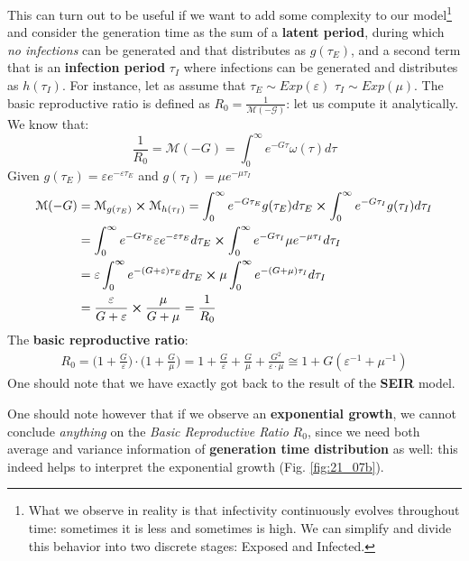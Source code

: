 \documentclass[../main/main.tex]{subfiles}
\begin{document}
This can turn out to be useful if we want to add some complexity to our model\footnote{What we observe in reality is that infectivity continuously evolves throughout time: sometimes it is less and sometimes is high. We can simplify and divide this behavior into two discrete stages: Exposed and Infected.} and consider the generation time as the sum of a \textbf{latent period}, during which \textit{no infections} can be generated and that distributes as $g(\tau_E)$, and a second term that is an \textbf{infection period} $\tau_I$ where infections can be generated and distributes as $h(\tau_I)$. For instance, let as assume that $\tau_E \sim Exp(\varepsilon)$ $\tau_I \sim Exp(\mu)$. The basic reproductive ratio is defined as $R_0 = \frac{1}{\mathcal{M(-G)}}$:
let us compute it analytically. We know that:
\begin{equation}
    \frac{1}{R_0} = \mathcal{M}(-G) = \int_{0}^{\infty} e^{-G \tau} \omega (\tau) d\tau
\end{equation}
Given $ g(\tau_E) = \varepsilon e^{-\varepsilon \tau_E} $ and $ g(\tau_I) = \mu e^{-\mu \tau_I} $
\begin{align*}
 \mathcal{M}(-G) & = \mathcal{M}_{g(\tau_E)} \cross \mathcal{M}_{h(\tau_I)} = \int_{0}^{\infty} e^{-G \tau_E} g(\tau_E) d\tau_E  \cross \int_{0}^{\infty} e^{-G \tau_I} g(\tau_I) d\tau_I\\
&= \int_{0}^{\infty} e^{-G \tau_E} \varepsilon e^{-\varepsilon \tau_E} d\tau_E \cross \int_{0}^{\infty} e^{-G \tau_I} \mu e^{-\mu \tau_I} d\tau_I\\
&= \varepsilon\int_{0}^{\infty} e^{-(G+\varepsilon) \tau_E} d\tau_E \cross \mu \int_{0}^{\infty} e^{-(G+\mu) \tau_I} d\tau_I\\
&= \frac{\varepsilon}{G+\varepsilon} \cross \frac{\mu}{G+\mu} = \frac{1}{R_0}
\end{align*}
The \textbf{basic reproductive ratio}:
\begin{align}
    {R_0}= \Big(1+\frac{G}{\varepsilon} \Big) \cdot \Big(1+\frac{G}{\mu} \Big) = 1+\frac{G}{\varepsilon}+\frac{G}{\mu}+\frac{G^2}{\varepsilon\cdot\mu} \cong 1+G(\varepsilon^{-1} + \mu^{-1})
\end{align}
One should note that we have exactly got back to the result of the \textbf{SEIR} model.


One should note however that if we observe an \textbf{exponential growth}, we cannot conclude \textit{anything} on the \textit{Basic Reproductive Ratio} $R_0$, since we need both average and variance information of \textbf{generation time distribution} as well: this indeed helps to interpret the exponential growth (Fig. \ref{fig:21_07b}).
\end{document}
